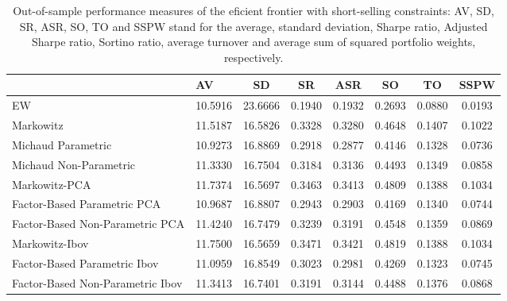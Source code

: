 \begin{table}

\caption{\label{tab:empirical_ef_2}Out-of-sample performance measures of the eficient frontier with short-selling constraints: AV, SD, SR, ASR, SO, TO and SSPW stand for the average, standard deviation, Sharpe ratio, Adjusted Sharpe ratio, Sortino ratio, average turnover and average sum of squared portfolio weights, respectively.}
\centering
\begin{tabular}[t]{l|l|c|c|c|c|c|c}
\hline
  & AV & SD & SR & ASR & SO & TO & SSPW\\
\hline
EW & 10.5916 & 23.6666 & 0.1940 & 0.1932 & 0.2693 & 0.0880 & 0.0193\\
\hline
Markowitz & 11.5187 & 16.5826 & 0.3328 & 0.3280 & 0.4648 & 0.1407 & 0.1022\\
\hline
Michaud Parametric & 10.9273 & 16.8869 & 0.2918 & 0.2877 & 0.4146 & 0.1328 & 0.0736\\
\hline
Michaud Non-Parametric & 11.3330 & 16.7504 & 0.3184 & 0.3136 & 0.4493 & 0.1349 & 0.0858\\
\hline
Markowitz-PCA & 11.7374 & 16.5697 & 0.3463 & 0.3413 & 0.4809 & 0.1388 & 0.1034\\
\hline
Factor-Based Parametric PCA & 10.9687 & 16.8807 & 0.2943 & 0.2903 & 0.4169 & 0.1340 & 0.0744\\
\hline
Factor-Based Non-Parametric PCA & 11.4240 & 16.7479 & 0.3239 & 0.3191 & 0.4548 & 0.1359 & 0.0869\\
\hline
Markowitz-Ibov & 11.7500 & 16.5659 & 0.3471 & 0.3421 & 0.4819 & 0.1388 & 0.1034\\
\hline
Factor-Based Parametric Ibov & 11.0959 & 16.8549 & 0.3023 & 0.2981 & 0.4269 & 0.1323 & 0.0745\\
\hline
Factor-Based Non-Parametric Ibov & 11.3413 & 16.7401 & 0.3191 & 0.3144 & 0.4488 & 0.1376 & 0.0868\\
\hline
\end{tabular}
\end{table}
